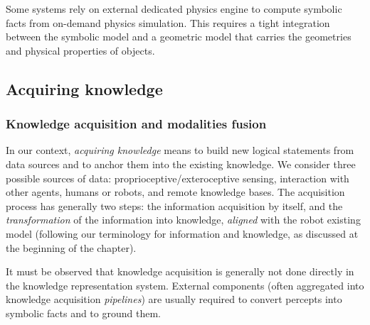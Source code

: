 Some systems \cite{Kunze2011a} rely on external dedicated physics engine to
compute symbolic facts from on-demand physics simulation. This requires a tight
integration between the symbolic model and a geometric model that carries the
geometries and physical properties of objects.


\subsection{Acquiring knowledge}

\begin{scriptsize}
\begin{center}
\end{center}
\end{scriptsize}

\subsubsection{Knowledge acquisition and modalities fusion}
\label{sect|knowledge-acquisition}

In our context, \emph{acquiring knowledge} means to build new logical
statements from data sources and to anchor them into the existing knowledge. We
consider three possible sources of data: proprioceptive/exteroceptive sensing,
interaction with other agents, humans or robots, and remote knowledge bases.
The acquisition process has generally two steps: the information acquisition by
itself, and the \emph{transformation} of the information into knowledge,
\emph{aligned} with the robot existing model (following our terminology for
information and knowledge, as discussed at the beginning of the chapter).

It must be observed that knowledge acquisition is generally not done directly
in the knowledge representation system. External components (often aggregated
into knowledge acquisition \emph{pipelines}) are usually required to convert
percepts into symbolic facts and to ground them.

